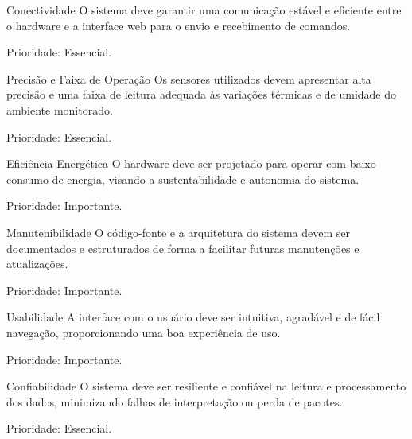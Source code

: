 \begin{nfreq}{Conectividade}
    O sistema deve garantir uma comunicação estável e eficiente entre o hardware e a interface web para o envio e recebimento de comandos.
    
    Prioridade: Essencial.
\end{nfreq}

\begin{nfreq}{Precisão e Faixa de Operação}
    Os sensores utilizados devem apresentar alta precisão e uma faixa de leitura adequada às variações térmicas e de umidade do ambiente monitorado.
    
    Prioridade: Essencial.
\end{nfreq}

\begin{nfreq}{Eficiência Energética}
    O hardware deve ser projetado para operar com baixo consumo de energia, visando a sustentabilidade e autonomia do sistema.
    
    Prioridade: Importante.
\end{nfreq}

\begin{nfreq}{Manutenibilidade}
    O código-fonte e a arquitetura do sistema devem ser documentados e estruturados de forma a facilitar futuras manutenções e atualizações.
    
    Prioridade: Importante.
\end{nfreq}

\begin{nfreq}{Usabilidade}
    A interface com o usuário deve ser intuitiva, agradável e de fácil navegação, proporcionando uma boa experiência de uso.
    
    Prioridade: Importante.
\end{nfreq}

\begin{nfreq}{Confiabilidade}
    O sistema deve ser resiliente e confiável na leitura e processamento dos dados, minimizando falhas de interpretação ou perda de pacotes.
    
    Prioridade: Essencial.
\end{nfreq}